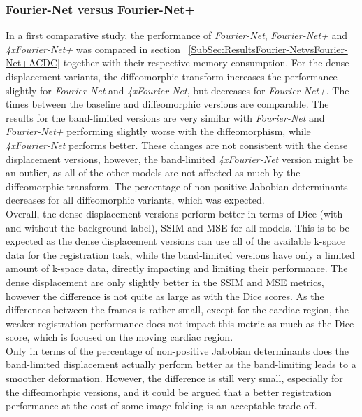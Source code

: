 \subsubsection{Fourier-Net versus Fourier-Net+} \label{SubSubSec:DiscussionFourier-NetvsFourier-Net+ACDC}
In a first comparative study, the performance of \emph{Fourier-Net}, \emph{Fourier-Net+} and \emph{4xFourier-Net+} was compared in section ~\ref{SubSec:ResultsFourier-NetvsFourier-Net+ACDC} together with their respective memory consumption. For the dense displacement variants, the diffeomorphic transform increases the performance slightly for \emph{Fourier-Net} and \emph{4xFourier-Net}, but decreases for \emph{Fourier-Net+}. The times between the baseline and diffeomorphic versions are comparable. The results for the band-limited versions are very similar with \emph{Fourier-Net} and \emph{Fourier-Net+} performing slightly worse  with the diffeomorphism, while \emph{4xFourier-Net} performs better.  These changes are not consistent with the dense displacement versions, however, the band-limited \emph{4xFourier-Net} version might be an outlier, as all of the other models are not affected as much by the diffeomorphic transform. The percentage of non-positive Jabobian determinants decreases for all diffeomorphic variants, which was expected.\\
Overall, the dense displacement versions perform better in terms of Dice (with and without the background label), SSIM and MSE for all models. This is to be expected as the dense displacement versions can use all of the available k-space data for the registration task, while the band-limited versions have only a limited amount of k-space data, directly impacting and limiting their performance. The dense displacement are only slightly better in the SSIM and MSE metrics, however the difference is not quite as large as with the Dice scores. As the differences between the frames is rather small, except for the cardiac region, the weaker registration performance does not impact this metric as much as the Dice score, which is focused on the moving cardiac region.\\
Only in terms of the percentage of non-positive Jabobian determinants does the band-limited displacement actually perform better as the band-limiting leads to a smoother deformation. However, the difference is still very small, especially for the diffeomorhpic versions, and it could be argued that a better registration performance at the cost of some image folding is an acceptable trade-off. \\
